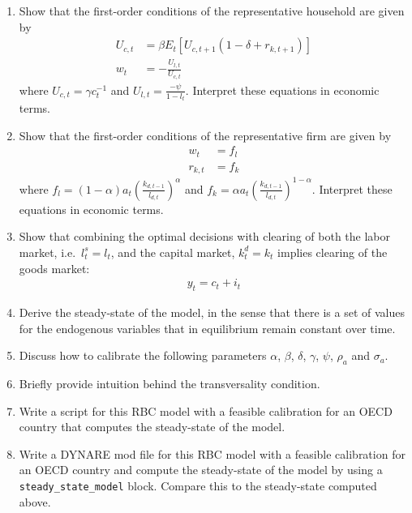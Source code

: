 \begin{enumerate}
\item Show that the first-order conditions of the representative household are given by
\begin{align*}
U_{c,t} &= \beta E_t\left[U_{c,t+1} \left(1-\delta + r_{k,t+1}\right)\right]
\\
w_t &= -\frac{U_{l,t}}{U_{c,t}}
\end{align*}
where \(U_{c,t} = \gamma c_t^{-1}\) and \(U_{l,t} = \frac{-\psi}{1-l_t}\).
Interpret these equations in economic terms.

\item Show that the first-order conditions of the representative firm are given by
\begin{align*}
w_t &= f_l
\\
r_{k,t} &= f_k
\end{align*}
where \(f_l = (1-\alpha) a_t {\left(\frac{k_{d,t-1}}{l_{d,t}}\right)}^\alpha \) and \(f_k = \alpha a_t {\left(\frac{k_{d,t-1}}{l_{d,t}}\right)}^{1-\alpha}\).
Interpret these equations in economic terms.

\item Show that combining the optimal decisions with clearing of both the labor market, i.e.\
\(l^s_t = l_t\), and the capital market, \(k^d_t = k_t\) implies clearing of the goods market:
\begin{align*}
y_t = c_t + i_t
\end{align*}  

\item Derive the steady-state of the model, in the sense that there is a set of values for the endogenous variables that in equilibrium remain constant over time.

\item Discuss how to calibrate the following parameters \(\alpha \), \(\beta \), \(\delta \), \(\gamma \), \(\psi \), \(\rho_a\) and \(\sigma_a\).

\item Briefly provide intuition behind the transversality condition.

\item Write a script for this RBC model with a feasible calibration for an OECD country that computes the steady-state of the model.

\item Write a DYNARE mod file for this RBC model with a feasible calibration for an OECD country
  and compute the steady-state of the model by using a \texttt{steady\_state\_model} block.
  Compare this to the steady-state computed above.


\end{enumerate}
